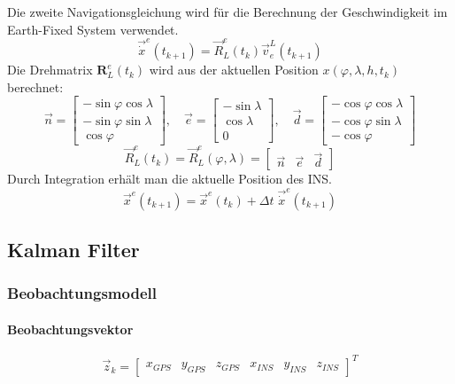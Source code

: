 Die zweite Navigationsgleichung wird für die Berechnung der Geschwindigkeit im Earth-Fixed System verwendet.
\begin{equation}
 	\vec{\dot{x}}^e(t_{k+1}) = \vec{R}_L^e(t_k) \vec{v}_e^L(t_{k+1})
\end{equation}
Die Drehmatrix $\mathbf{R}_L^e(t_k)$ wird aus der aktuellen Position $x(\varphi,\lambda,h,t_k)$ berechnet:
\begin{equation}
	\vec{n} =	\begin{bmatrix}
			-\sin\varphi \cos\lambda \\ 
			-\sin\varphi \sin\lambda \\ 
			\cos\varphi
		\end{bmatrix}, \quad
	\vec{e} =	\begin{bmatrix}
			-\sin\lambda \\  
			\cos\lambda \\ 
			0
		\end{bmatrix}, \quad
	\vec{d} =	\begin{bmatrix}
			-\cos\varphi \cos\lambda \\ 
			-\cos\varphi \sin\lambda \\ 
			-\cos\varphi
		\end{bmatrix}
\end{equation}
\begin{equation}
 	\vec{R}_L^e(t_k) = \vec{R}_L^e(\varphi,\lambda) = \begin{bmatrix}\vec{n}& \vec{e}& \vec{d}\end{bmatrix}
\end{equation}
 Durch Integration erhält man die aktuelle Position des INS.
\begin{equation}
 	\vec{x}^e(t_{k+1}) = \vec{x}^e(t_k) + \Delta t \; \vec{\dot{x}}^e(t_{k+1})
\end{equation}

\subsection{Kalman Filter}

\subsubsection{Beobachtungsmodell}
\paragraph{Beobachtungsvektor}

\begin{equation}
	\vec{z}_k = \begin{bmatrix}
		x_{GPS}&y_{GPS}&z_{GPS}&x_{INS}&y_{INS}&z_{INS}
	\end{bmatrix}^T
\end{equation}

